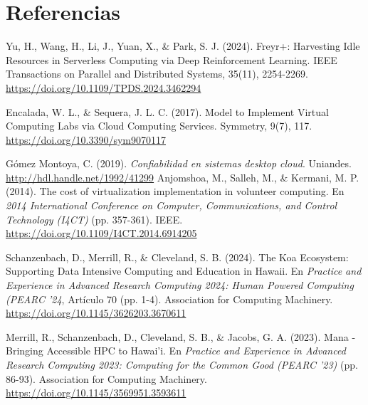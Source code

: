 \section{Referencias}

\begin{thebibliography}{99}

\bibitem{} Yu, H., Wang, H., Li, J., Yuan, X., & Park, S. J. (2024). Freyr+: Harvesting Idle Resources in Serverless Computing via Deep Reinforcement Learning. IEEE Transactions on Parallel and Distributed Systems, 35(11), 2254-2269. \url{https://doi.org/10.1109/TPDS.2024.3462294}

\bibitem{} Encalada, W. L., & Sequera, J. L. C. (2017). Model to Implement Virtual Computing Labs via Cloud Computing Services. Symmetry, 9(7), 117. \url{https://doi.org/10.3390/sym9070117}  

 Gómez Montoya, C. (2019). \textit{Confiabilidad en sistemas desktop cloud}. Uniandes. \url{http://hdl.handle.net/1992/41299}
 Anjomshoa, M., Salleh, M., \& Kermani, M. P. (2014). The cost of virtualization implementation in volunteer computing. En \textit{2014 International Conference on Computer, Communications, and Control Technology (I4CT)} (pp. 357-361). IEEE. \url{https://doi.org/10.1109/I4CT.2014.6914205}

 Schanzenbach, D., Merrill, R., \& Cleveland, S. B. (2024). The Koa Ecosystem: Supporting Data Intensive Computing and Education in Hawaii. En \textit{Practice and Experience in Advanced Research Computing 2024: Human Powered Computing (PEARC '24}, Artículo 70 (pp. 1-4). Association for Computing Machinery. \url{https://doi.org/10.1145/3626203.3670611}

 Merrill, R., Schanzenbach, D., Cleveland, S. B., \& Jacobs, G. A. (2023). Mana - Bringing Accessible HPC to Hawai'i. En \textit{Practice and Experience in Advanced Research Computing 2023: Computing for the Common Good (PEARC '23)} (pp. 86-93). Association for Computing Machinery. \url{https://doi.org/10.1145/3569951.3593611}

\end{thebibliography}